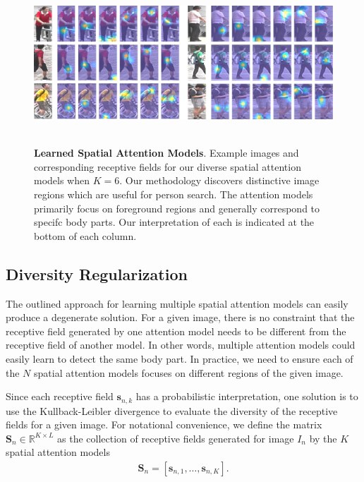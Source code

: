 \begin{figure}[t]
\begin{center}
\includegraphics[width=1\linewidth]{figures/person_reid/attention.pdf} \ \\
\end{center}
\vspace{-3mm}
\caption{\textbf{Learned Spatial Attention Models}. Example images and corresponding receptive fields for our diverse spatial attention models when $K=6$. Our methodology discovers distinctive image regions which are useful for person search.  The attention models primarily focus on foreground regions and generally correspond to specifc body parts.  Our interpretation of each is indicated at the bottom of each column.}
\label{vis}
\end{figure}


\subsection{Diversity Regularization}
\label{sec:diversity}

The outlined approach for learning multiple spatial attention models can easily produce a degenerate solution.  For a given image, there is no constraint that the receptive field generated by one attention model needs to be different from the receptive field of another model. In other words, multiple attention models could easily learn to detect the same body part.  In practice, we need to ensure each of the $N$ spatial attention models focuses on different regions of the given image.

Since each receptive field $\mathbf{s}_{n,k}$ has a probabilistic interpretation, one solution is to use the Kullback-Leibler divergence to evaluate the diversity of the receptive fields for a given image. For notational convenience, we define the matrix $\mathbf{S}_n \in \mathbb{R}^{K \times L}$ as the collection of receptive fields generated for image $I_n$ by the $K$ spatial attention models
%
\begin{align}
    \mathbf{S}_n = [ \mathbf{s}_{n,1}, \ldots, \mathbf{s}_{n,K}].
\end{align}

